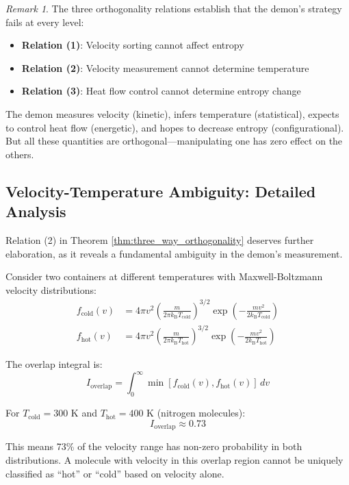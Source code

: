 \documentclass[10pt,twocolumn,letterpaper]{article}
\theoremstyle{definition}
\theoremstyle{remark}
\newtheorem{remark}[theorem]{Remark}
\newcommand{\kb}{k_\text{B}}
\begin{document}
\begin{remark}
The three orthogonality relations establish that the demon's strategy fails at every level:
\begin{itemize}
\item \textbf{Relation (1)}: Velocity sorting cannot affect entropy
\item \textbf{Relation (2)}: Velocity measurement cannot determine temperature
\item \textbf{Relation (3)}: Heat flow control cannot determine entropy change
\end{itemize}

The demon measures velocity (kinetic), infers temperature (statistical), expects to control heat flow (energetic), and hopes to decrease entropy (configurational). But all these quantities are orthogonal—manipulating one has zero effect on the others.
\end{remark}

\subsection{Velocity-Temperature Ambiguity: Detailed Analysis}

Relation (2) in Theorem \ref{thm:three_way_orthogonality} deserves further elaboration, as it reveals a fundamental ambiguity in the demon's measurement.

Consider two containers at different temperatures with Maxwell-Boltzmann velocity distributions:
\begin{align}
f_{\text{cold}}(v) &= 4\pi v^2 \left(\frac{m}{2\pi \kb T_{\text{cold}}}\right)^{3/2} \exp\left(-\frac{mv^2}{2\kb T_{\text{cold}}}\right) \\
f_{\text{hot}}(v) &= 4\pi v^2 \left(\frac{m}{2\pi \kb T_{\text{hot}}}\right)^{3/2} \exp\left(-\frac{mv^2}{2\kb T_{\text{hot}}}\right)
\end{align}

The overlap integral is:
\begin{equation}
I_{\text{overlap}} = \int_0^\infty \min[f_{\text{cold}}(v), f_{\text{hot}}(v)] \, dv
\label{eq:overlap_integral}
\end{equation}

For $T_{\text{cold}} = 300$ K and $T_{\text{hot}} = 400$ K (nitrogen molecules):
\begin{equation}
I_{\text{overlap}} \approx 0.73
\end{equation}

This means 73\% of the velocity range has non-zero probability in both distributions. A molecule with velocity in this overlap region cannot be uniquely classified as ``hot'' or ``cold'' based on velocity alone.
\end{document}

